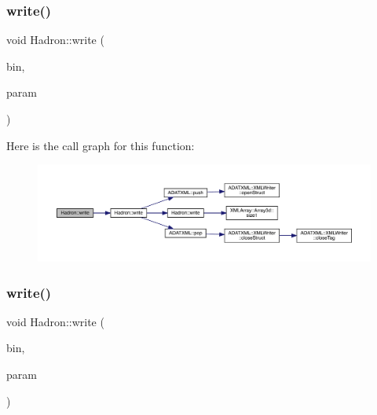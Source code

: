 \subsubsection{\texorpdfstring{write()}{write()}\hspace{0.1cm}{\footnotesize\ttfamily [60/95]}}
{\footnotesize\ttfamily void Hadron\+::write (\begin{DoxyParamCaption}\item[{\mbox{\hyperlink{classADATIO_1_1BinaryWriter}{Binary\+Writer}} \&}]{bin,  }\item[{const \mbox{\hyperlink{structHadron_1_1HadronDiagramTimeSlices__t}{Hadron\+Diagram\+Time\+Slices\+\_\+t}} \&}]{param }\end{DoxyParamCaption})}

Here is the call graph for this function\+:
\nopagebreak
\begin{figure}[H]
\begin{center}
\leavevmode
\includegraphics[width=350pt]{d1/daf/namespaceHadron_a70fe8dc6184653dde216306a0f4681d9_cgraph}
\end{center}
\end{figure}
\mbox{\label{namespaceHadron_af1d6496318c689e52be27a9f842ccc2d}} 
\subsubsection{\texorpdfstring{write()}{write()}\hspace{0.1cm}{\footnotesize\ttfamily [61/95]}}
{\footnotesize\ttfamily void Hadron\+::write (\begin{DoxyParamCaption}\item[{\mbox{\hyperlink{classADATIO_1_1BinaryWriter}{Binary\+Writer}} \&}]{bin,  }\item[{const \mbox{\hyperlink{structHadron_1_1KeyGenPropElementalOperator__t}{Key\+Gen\+Prop\+Elemental\+Operator\+\_\+t}} \&}]{param }\end{DoxyParamCaption})}




